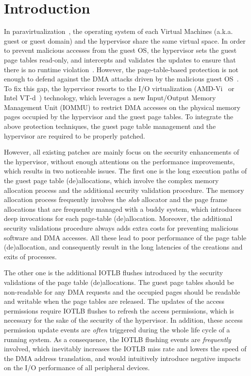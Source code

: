 \section{Introduction} \label{sec:intro}
In paravirtualization~\cite{XEN-SOSP03,whitaker2002scale}, the operating system of each Virtual Machines (a.k.a. guest or guest domain) and the hypervisor share the same virtual space.
In order to prevent malicious accesses from the guest OS, the hypervisor sets the guest page tables read-only, and intercepts and validates the updates to ensure that there is no runtime violation~\cite{XEN-SOSP03}.
However, the page-table-based protection is not enough to defend against the DMA attacks driven by the malicious guest OS~\cite{disaggregation}.
To fix this gap, the hypervisor resorts to the I/O virtualization (AMD-Vi~\cite{amdvt} or Intel VT-d~\cite{intelvt}) technology, which leverages a new Input/Output Memory Management Unit (IOMMU) to restrict DMA accesses on the physical memory pages occupied by the hypervisor and the guest page tables.
To integrate the above protection techniques, the guest page table management and the hypervisor are required to be properly patched.

However, all existing patches are mainly focus on the security enhancements of the hypervisor, without enough attentions on the performance improvements, which results in two noticeable issues.
The first one is the long execution paths of the guest page table (de)allocations, which involve the complex memory allocation process and the additional security validation procedure. 
The memory allocation process frequently involves the \emph{slab} allocator and the page frame allocations that are frequently managed with a buddy system, which introduces deep invocations for each page-table (de)allocation.
Moreover, the additional security validations procedure always adds extra costs for preventing malicious software and DMA accesses.  
All these lead to poor performance of the page table (de)allocation, and consequently result in the long latencies of the creations and exits of processes. 

The other one is the additional IOTLB flushes introduced by the security validations of the page table (de)allocations. 
The guest page tables should be non-readable for any DMA requests and the occupied pages should be readable and writable when the page tables are released. 
The updates of the access permissions require IOTLB flushes to refresh the access permissions, which is necessary for the sake of the security of the hypervisor.
In addition, these access permission update events are \emph{often} triggered during the whole life cycle of a running system.
As a consequence, the IOTLB flushing events are \emph{frequently} involved, which inevitably increases the IOTLB miss rate and lowers the speed of the DMA address translation, and would intuitively introduce negative impacts on the I/O performance of all peripheral devices. 

